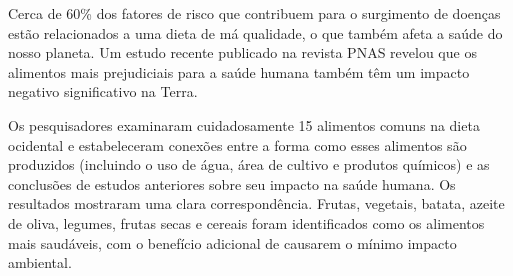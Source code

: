 \begin{myquote}







Cerca de 60\% dos fatores de risco que contribuem para o surgimento de doenças
estão relacionados a uma dieta de má qualidade, o que também afeta a saúde do
nosso planeta. Um estudo recente publicado na revista PNAS revelou que os
alimentos mais prejudiciais para a saúde humana também têm um impacto negativo
significativo na Terra.

Os pesquisadores examinaram cuidadosamente 15 alimentos comuns na dieta
ocidental e estabeleceram conexões entre a forma como esses alimentos são
produzidos (incluindo o uso de água, área de cultivo e produtos químicos) e as
conclusões de estudos anteriores sobre seu impacto na saúde humana. Os
resultados mostraram uma clara correspondência. Frutas, vegetais, batata,
azeite de oliva, legumes, frutas secas e cereais foram identificados como os
alimentos mais saudáveis, com o benefício adicional de causarem o mínimo
impacto ambiental.


\end{myquote}
